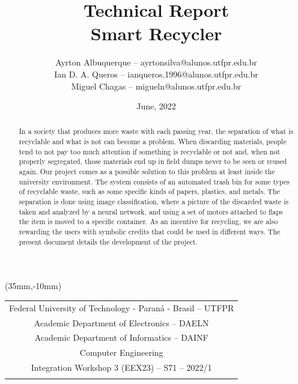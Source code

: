 \documentclass[a4paper,11pt]{article}
\title{
Technical Report\\
\textbf{Smart Recycler}}
\author{
Ayrton Albuquerque \footnotesize{-- ayrtonsilva@alunos.utfpr.edu.br}\\
Ian D. A. Queros \footnotesize{-- ianqueros.1996@alunos.utfpr.edu.br}\\
Miguel Chagas \footnotesize{-- migueln@alunos.utfpr.edu.br}\\
}
\date{June, 2022}
\begin{document}
\thisfancyput(35mm,-10mm){
  \begin{tabular}{c}
    Federal University of Technology - Paraná - Brasil -- \small{UTFPR} \\
    Academic Department of Electronics -- \small{DAELN}                 \\
    Academic Department of Informatics -- \small{DAINF}                 \\
    Computer Engineering                                                \\
    Integration Workshop 3 (EEX23) -- S71 -- 2022/1                     \\
    \\
    \hline
  \end{tabular}}

\maketitle

\begin{abstract}
  \noindent In a society that produces more waste with each passing year, the separation of what is recyclable and what is not can become a problem. When discarding materials, people tend to not pay too much attention if something is recyclable or not and, when not properly segregated, those materials end up in field dumps never to be seen or reused again. Our project comes as a possible solution to this problem at least inside the university environment. The system consists of an automated trash bin for some types of recyclable waste, such as some specific kinds of papers, plastics, and metals. The separation is done using image classification, where a picture of the discarded waste is taken and analyzed by a neural network, and using a set of motors attached to flaps the item is moved to a specific container. As an incentive for recycling, we are also rewarding the users with symbolic credits that could be used in different ways. The present document details the development of the project.
\end{abstract}

\end{document}
